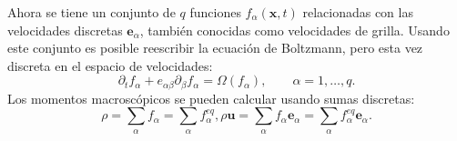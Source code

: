Ahora se tiene un conjunto de $q$ funciones $f_{\alpha}(\bm{x},t)$ relacionadas con las velocidades discretas $\bm{e}_{\alpha}$, tambi\'en conocidas como velocidades de grilla. Usando este conjunto es posible reescribir la ecuaci\'on de Boltzmann, pero esta vez discreta en el espacio de velocidades:
\begin{equation}
	\partial_t f_{\alpha} + e_{\alpha\beta} \partial_{\beta} f_{{\alpha}} = \Omega(f_{\alpha}), \qquad {\alpha}=1,\ldots, q.
	\label{eq:boltz_disc_vel}
\end{equation}
Los momentos macrosc\'opicos se pueden calcular usando sumas discretas:
\begin{subequations}
	\begin{equation}
		\rho        = \sum_{\alpha} f_{\alpha}          = \sum_{\alpha} f_{\alpha}^{eq},
	\end{equation}
	\begin{equation}
		\rho \bm{u} = \sum_{\alpha} f_{\alpha}\bm{e}_{\alpha}  = \sum_{\alpha} f_{\alpha}^{eq}\bm{e}_{\alpha}.
	\end{equation}
\end{subequations}


